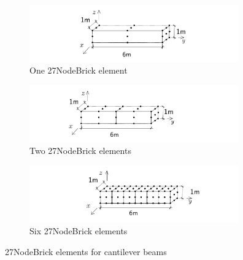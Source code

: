 \documentclass[fleqn,11pt]{article}
\begin{document}
\begin{figure}[H]
  \centering
  \begin{subfigure}{0.5\textwidth}
    \centering
    \includegraphics[width=9cm]{../Figure-files/beam_27brick_1div.pdf}
    \caption{One 27NodeBrick element}
  \end{subfigure}
  \vskip 8pt
  \begin{subfigure}{0.5\textwidth}
    \centering
    \includegraphics[width=9cm]{../Figure-files/beam_27brick_2div.pdf}
    \caption{Two 27NodeBrick elements}
  \end{subfigure}
  \vskip 8pt
  \begin{subfigure}{0.5\textwidth}
    \centering
    \includegraphics[width=9cm]{../Figure-files/beam_27brick_6div.pdf}
    \caption{Six 27NodeBrick elements}
  \end{subfigure}
  \captionsetup{justification=centering,margin=3cm}
  \caption{27NodeBrick elements for cantilever beams}
  \label{fig 27NodeBrick elements for cantilever beams}
\end{figure}





\end{document}
